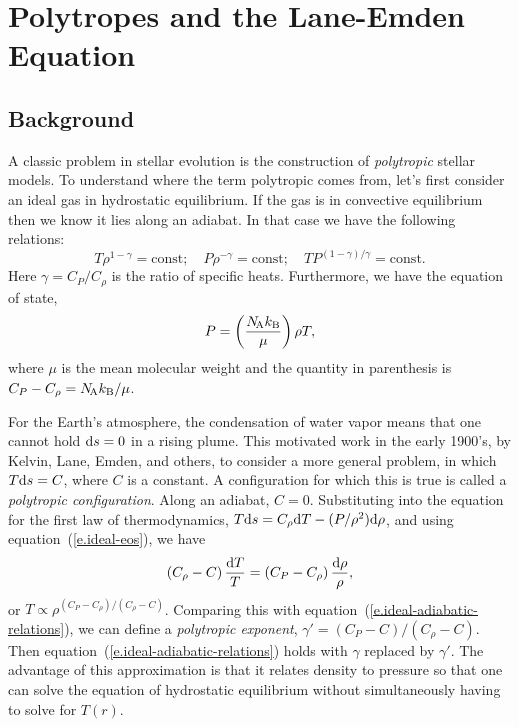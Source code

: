 \chapter{Polytropes and the Lane-Emden Equation}

\section{Background}\label{s.LE-background}

A classic problem in stellar evolution is the construction of \emph{polytropic} stellar models.  To understand where the term polytropic comes from, let's first consider an ideal gas in hydrostatic equilibrium.  If the gas is in convective equilibrium then we know it lies along an adiabat.  In that case we have the following relations:
\begin{equation}\label{e.ideal-adiabatic-relations} 
T\rho^{1-\gamma} = \mathrm{const};\quad P\rho^{-\gamma} = \mathrm{const};\quad TP^{(1-\gamma)/\gamma} = \mathrm{const}.
\end{equation}
Here $\gamma = C_{P}/C_{\rho}$ is the ratio of specific heats. Furthermore, we have the equation of state,
\begin{equation}\label{e.ideal-eos}
P = \left(\frac{N_\mathrm{\!A}k_\mathrm{B}}{\mu}\right)\rho T,
\end{equation}
where $\mu$ is the mean molecular weight and the quantity in parenthesis is $C_{P}-C_{\rho} = N_\mathrm{\!A}k_\mathrm{B}/\mu$.

For the Earth's atmosphere, the condensation of water vapor means that one cannot hold $\mathrm{d} s = 0$ in a rising plume.  This motivated work in the early 1900's, by Kelvin, Lane, Emden, and others, to consider a more general problem, in which $T\mathrm{d} s = C$, where $C$ is a constant.  A configuration for which this is true is called a \emph{polytropic configuration}. Along an adiabat, $C = 0$. Substituting into the equation for the first law of thermodynamics, $T\mathrm{d} s = C_{\rho}\mathrm{d} T -(P/\rho^{2})\mathrm{d} \rho$, and using equation~(\ref{e.ideal-eos}), we have
\[
\left(C_{\rho}-C\right)\frac{\mathrm{d} T}{T} = \left( C_{P} - C_{\rho}\right)\frac{\mathrm{d}\rho}{\rho},
\]
or $T  \propto  \rho^{(C_{P}-C_{\rho})/(C_{\rho}-C)}$. Comparing this with equation~(\ref{e.ideal-adiabatic-relations}), we can define a \emph{polytropic exponent}, $\gamma' = (C_{P}-C)/(C_{\rho}-C)$. Then equation~(\ref{e.ideal-adiabatic-relations}) holds with $\gamma$ replaced by $\gamma'$.  The advantage of this approximation is that it relates density to pressure so that one can solve the equation of hydrostatic equilibrium without simultaneously having to solve for $T(r)$.


